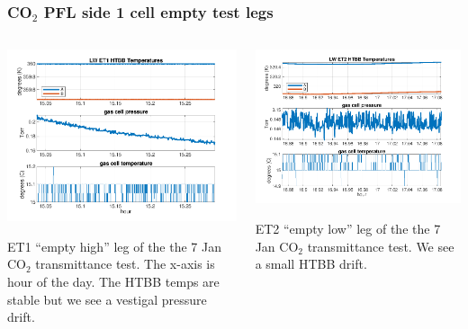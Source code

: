 \documentclass[10pt]{beamer}
\begin{document}
\begin{frame}
\frametitle{CO$_2$ PFL side 1 cell empty test legs}
\begin{columns}[t]
\begin{column}{0.5\textwidth}
  \begin{centering}
  \includegraphics[width=\textwidth]{harvest_01-07/01-07_LW_ET1.png}
  \end{centering}\vspace{3mm}

  ET1 ``empty high'' leg of the the 7 Jan CO$_2$ transmittance test.
  The x-axis is hour of the day. The HTBB temps are stable but we
  see a vestigal pressure drift.

\end{column}
\begin{column}{0.5\textwidth}  
  \begin{centering}
  \includegraphics[width=\textwidth]{harvest_01-07/01-07_LW_ET2.png}
  \end{centering}\vspace{3mm}

  ET2 ``empty low'' leg of the the 7 Jan CO$_2$ transmittance test.
  We see a small HTBB drift.

\end{column}
\end{columns}
\end{frame}
\end{document}
